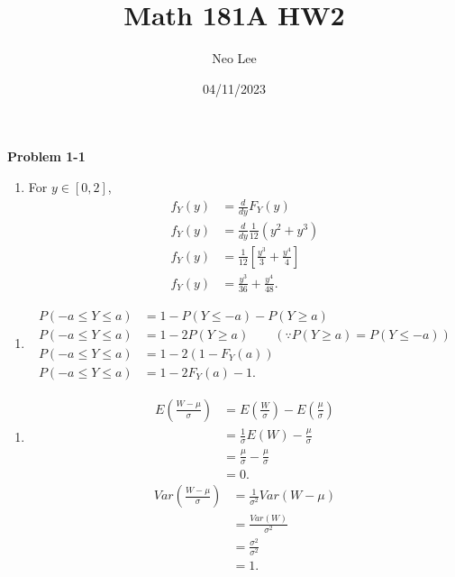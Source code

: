 \documentclass{article}
\title{Math 181A HW2}
\author{Neo Lee}
\date{04/11/2023}
\begin{document}
 

\maketitle 

\textbf{Problem 1-1}
\begin{enumerate}[label={(3.4.13)}]
    \item 
    For $y \in [0,2]$,
    \begin{align}
        f_Y(y) &= \frac{d}{dy}F_Y(y) \nonumber \\
        f_Y(y) &= \frac{d}{dy}\frac{1}{12}(y^2 + y^3) \nonumber \\
        f_Y(y) &= \frac{1}{12}\left[\frac{y^3}{3}+\frac{y^4}{4}\right] \nonumber \\
        f_Y(y) &= \frac{y^3}{36} + \frac{y^4}{48}. \nonumber 
    \end{align}
\end{enumerate}
\begin{enumerate}[label={(3.4.17)}]
    \item 
    \begin{align}
        P(-a \le Y \le a) & = 1 - P(Y \le -a) - P(Y \ge a) \nonumber \\
        P(-a \le Y \le a) & = 1 - 2P(Y \ge a) \nonumber \qquad (\because P(Y \ge a) = P(Y \le -a)) \\
        P(-a \le Y \le a) & = 1 - 2(1-F_Y(a)) \nonumber \\
        P(-a \le Y \le a) & = 1 - 2F_Y(a) - 1. \nonumber
    \end{align}
\end{enumerate}
\begin{enumerate}[label={(3.6.16)}]
    \item 
    \begin{align}
        E\left(\frac{W-\mu}{\sigma}\right) & = E\left(\frac{W}{\sigma}\right) - E\left(\frac{\mu}{\sigma}\right) \nonumber \\
        & = \frac{1}{\sigma}E(W) - \frac{\mu}{\sigma} \nonumber \\
        & = \frac{\mu}{\sigma} - \frac{\mu}{\sigma} \nonumber \\
        & = 0.\nonumber
    \end{align}
    \begin{align}
        Var\left(\frac{W-\mu}{\sigma}\right) & = \frac{1}{\sigma^2} Var(W-\mu) \nonumber \\
        & = \frac{Var(W)}{\sigma^2} \nonumber \\
        & = \frac{\sigma^2}{\sigma^2} \nonumber \\
        & = 1.\nonumber
    \end{align}
\end{enumerate}
\bigbreak
\end{document}
